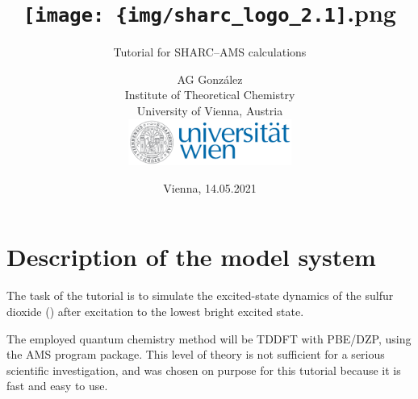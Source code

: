 \documentclass[a4paper,11pt,DIV=15,openany]{scrbook}
\title{\hspace{1cm}\texttt{[image: \{img/sharc\_logo\_2.1]}.png}\\[0.5cm]
\subtitle{Tutorial for SHARC--AMS calculations\\[1cm]}
\date{Vienna, 14.05.2021}
\author{AG Gonz\'alez\\
Institute of Theoretical Chemistry\\
University of Vienna, Austria
\vspace{1cm}
\\
\includegraphics[width=0.4\textwidth,keepaspectratio=true]{img/univie.pdf}}
\begin{document}
\tpage


\newpage
{}
\ohead{\leftmark\quad {\normalfont|} \quad\rightmark}
\ofoot[\pagemark]{\pagemark}


\tableofcontents


\chapter{Description of the model system}
\label{sec:model_system}

The task of the tutorial is to simulate the excited-state dynamics of the sulfur dioxide () after excitation to the lowest bright excited state.

The employed quantum chemistry method will be TDDFT with PBE/DZP, using the \textsc{AMS} program package. 
This level of theory is not sufficient for a serious scientific investigation, and was chosen on purpose for this tutorial because it is fast and easy to use.
\end{document}
